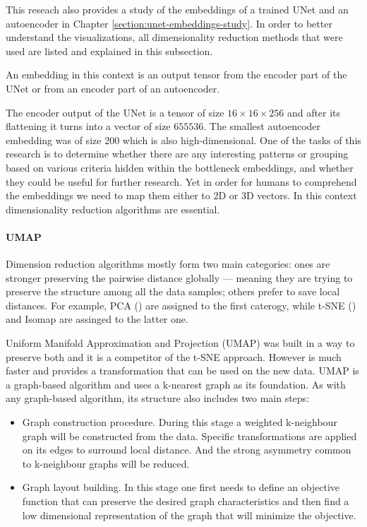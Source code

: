 This reseach also provides a study of the embeddings of a trained UNet and an autoencoder in Chapter \ref{section:unet-embeddings-study}. In order to better understand the visualizations, all dimensionality reduction methods that were used are listed and explained in this subsection.

\begin{definition}[Embedding]
    An embedding in this context is an output tensor from the encoder part of the UNet or from an encoder part of an autoencoder.
\end{definition}

The encoder output of the UNet is a tensor of size $16 \times 16 \times 256$ and after its flattening it turns into a vector of size $655536$. The smallest autoencoder embedding was of size 200 which is also high-dimensional. One of the tasks of this research is to determine whether there are any interesting patterns or grouping based on various criteria hidden within the bottleneck embeddings, and whether they could be useful for further research. Yet in order for humans to comprehend the embeddings we need to map them either to 2D or 3D vectors. In this context dimensionality reduction algorithms are essential.

\paragraph{UMAP}
Dimension reduction algorithms mostly form two main categories: ones are stronger preserving the pairwise
distance globally --- meaning they are trying to preserve the structure among all the data samples; others prefer to save local distances. For example, PCA (\cite{Hotelling_1933}) are assigned to the first caterogy, while t-SNE (\cite{tsne}) and Isomap are assinged to the latter one.

Uniform Manifold Approximation and Projection (UMAP) was built in a way to preserve both and it is a competitor of the t-SNE approach. However is much faster and provides a transformation that can be used on the new data. UMAP is a graph-based algorithm and uses a k-nearest graph as its foundation. As with any graph-based algorithm, its structure also includes two main steps: 

\begin{itemize}
    \item Graph construction procedure. During this stage a weighted k-neighbour graph will be constructed from the data. Specific transformations are applied on its edges to surround local distance. And the strong asymmetry common to k-neighbour graphs will be reduced.
    \item Graph layout building. In this stage one first needs to define an objective function that can preserve the desired graph characteristics and then find a low dimensional representation of the graph that will minimize the objective.
\end{itemize}

